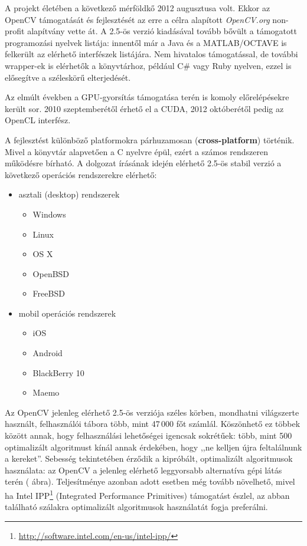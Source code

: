 \bigskip

A projekt életében a következő mérföldkő 2012 augusztusa volt. Ekkor az OpenCV támogatását és fejlesztését az erre a célra alapított \emph{OpenCV.org} non-profit alapítvány vette át. A 2.5-ös verzió kiadásával tovább bővült a támogatott programozási nyelvek listája: innentől már a Java és a MATLAB/OCTAVE is felkerült az elérhető interfészek listájára. Nem hivatalos támogatással, de további wrapper-ek is elérhetők a könyvtárhoz, például C\# vagy Ruby nyelven, ezzel is elősegítve a széleskörű elterjedését. 

Az elmúlt években a GPU-gyorsítás támogatása terén is komoly előrelépésekre került sor. 2010 szeptemberétől érhető el a CUDA, 2012 októberétől pedig az OpenCL interfész.

\bigskip

A fejlesztést különböző platformokra párhuzamosan (\textbf{cross-platform}) történik. Mivel a könyvtár alapvetően a C nyelvre épül, ezért a számos rendszeren működésre bírható. A dolgozat írásának idején elérhető 2.5-ös stabil verzió a következő operációs rendszerekre elérhető:

\begin{itemize}
  \item asztali (desktop) rendszerek
  \begin{itemize}
    \item Windows
    \item Linux
    \item OS X
    \item OpenBSD
    \item FreeBSD  
  \end{itemize}
  \item mobil operációs rendszerek
  \begin{itemize}
    \item iOS
    \item Android
    \item BlackBerry 10
    \item Maemo
  \end{itemize}   
\end{itemize}

Az OpenCV jelenleg elérhető 2.5-ös verziója széles körben, mondhatni világszerte használt, felhasználói tábora több, mint 47\,000 főt számlál. Köszönhető ez többek között annak, hogy felhasználási lehetőségei igencsak sokrétűek: több, mint 500 optimalizált algoritmust kínál annak érdekében, hogy ,,ne kelljen újra feltalálnunk a kereket''. Sebesség tekintetében érződik a kipróbált, optimalizált algoritmusok használata: az OpenCV a jelenleg elérhető leggyorsabb alternatíva gépi látás terén ( ábra). Teljesítménye azonban adott esetben még tovább növelhető, mivel ha Intel IPP\footnote{\url{http://software.intel.com/en-us/intel-ipp/}} (Integrated Performance Primitives) támogatást észlel, az abban található szálakra optimalizált algoritmusok használatát fogja preferálni.

